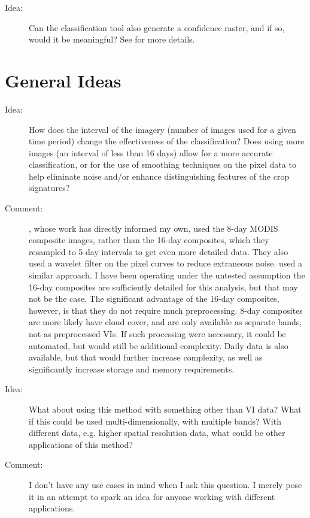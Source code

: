 \begin{description}
\item[Idea:] Can the classification tool also generate a confidence raster, and if so, would it be meaningful? See 
for more details.
\end{description}

\section{General Ideas}

\begin{description}
\item[Idea:] How does the interval of the imagery (number of images used for a given time period) change the effectiveness of the classification? Does using more images (an interval of less than 16 days) allow for a more accurate classification, or for the use of smoothing techniques on the pixel data to help eliminate noise and/or enhance distinguishing features of the crop signatures?

\item[Comment:] \textcite{sakamoto2010a-two-step}, whose work has directly informed my own, used the 8-day MODIS composite images, rather than the 16-day composites, which they resampled to 5-day intervals to get even more detailed data. They also used a wavelet filter on the pixel curves to reduce extraneous noise. \textcite{doraiswamy2006improved} used a similar approach. I have been operating under the untested assumption the 16-day composites are sufficiently detailed for this analysis, but that may not be the case. The significant advantage of the 16-day composites, however, is that they do not require much preprocessing. 8-day composites are more likely have cloud cover, and are only available as separate bands, not as preprocessed VIs. If such processing were necessary, it could be automated, but would still be additional complexity. Daily data is also available, but that would further increase complexity, as well as significantly increase storage and memory requirements.

\item[Idea:] What about using this method with something other than VI data? What if this could be used multi-dimensionally, with multiple bands? With different data, e.g. higher spatial resolution data, what could be other applications of this method?

\item[Comment:] I don’t have any use cases in mind when I ask this question. I merely pose it in an attempt to spark an idea for anyone working with different applications.
\end{description}

